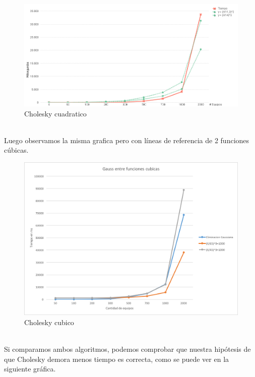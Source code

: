 \begin{figure}[H]
\centering
\includegraphics[width=1\textwidth]{IMG/cholesky cuadratico.png}
\caption{Cholesky cuadratico}
\label{fig:Cholesky cuadratico}
\end{figure}

\\

Luego observamos la misma grafica pero con líneas de referencia de 2 funciones cúbicas.\\

\begin{figure}[H]
\centering
\includegraphics[width=1\textwidth]{IMG/gaussEntreCubicas.png}
\caption{Cholesky cubico}
\label{fig:Cholesky cubico}
\end{figure}

\\

Si comparamos ambos algoritmos, podemos comprobar que nuestra hipótesis de que Cholesky demora menos tiempo es correcta, como se puede ver en la siguiente gráfica.

